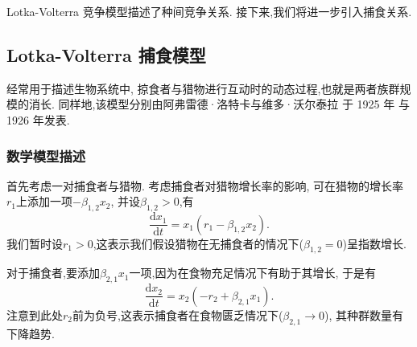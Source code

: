 \documentclass[a4paper, twocolumn]{ctexart}
\begin{document}
Lotka-Volterra 竞争模型描述了种间竞争关系.
接下来,我们将进一步引入捕食关系.

\subsection{Lotka-Volterra 捕食模型} \label{sec:models:lv-pred}
经常用于描述生物系统中,
掠食者与猎物进行互动时的动态过程,也就是两者族群规模的消长.
同样地,该模型分别由阿弗雷德·洛特卡与维多·沃尔泰拉
于 1925 年\autocite{lotka-elements}
与 1926 年\autocite{volterra-variazioni}发表.

\subsubsection{数学模型描述}
首先考虑一对捕食者与猎物.
考虑捕食者对猎物增长率的影响,
可在猎物的增长率$r_1$上添加一项$-\beta_{1,2} x_2$,
并设$\beta_{1,2} > 0$,有
\begin{equation} \label{eq:lv-pred:part:1}
    \frac{\mathrm{d} x_1}{\mathrm{d} t} = x_1 (r_1 - \beta_{1,2} x_2).
\end{equation}
我们暂时设$r_1 > 0$,这表示我们假设猎物在无捕食者的情况下($\beta_{1,2} = 0$)呈指数增长.

对于捕食者,要添加$\beta_{2,1} x_1$一项,因为在食物充足情况下有助于其增长,
于是有
\begin{equation} \label{eq:lv-pred:part:2}
    \frac{\mathrm{d} x_2}{\mathrm{d} t} = x_2 (-r_2 + \beta_{2,1} x_1).
\end{equation}
注意到此处$r_2$前为负号,这表示捕食者在食物匮乏情况下($\beta_{2,1} \rightarrow 0$),
其种群数量有下降趋势.
\end{document}
